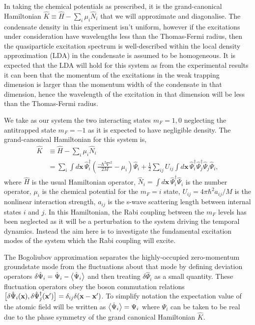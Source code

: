 In taking the chemical potentials as prescribed, it is the grand-canonical Hamiltonian $\hat{K} \equiv \hat{H} - \sum_i \mu_i \hat{N}_i$ that we will approximate and diagonalise.  The condensate density in this experiment isn't uniform, however if the excitations under consideration have wavelengths less than the Thomas-Fermi radius, then the quasiparticle excitation spectrum is well-described within the local density approximation (LDA) \citep{Stamper-Kurn:1999,Zambelli:2000} in the condensate is assumed to be homogeneous.  It is expected that the LDA will hold for this system as from the experimental results it can been that the momentum of the excitations in the weak trapping dimension is larger than the momentum width of the condensate in that dimension, hence the wavelength of the excitation in that dimension will be less than the Thomas-Fermi radius.


We take as our system the two interacting states $m_F=1, 0$ neglecting the antitrapped state $m_F=-1$ as it is expected to have negligible density. The grand-canonical Hamiltonian for this system is,
\begin{align}
    \hat{K} &\equiv \hat{H} - \sum_i \mu_i \hat{N}_i\\
            &= \sum_i \int d\mathbf{x}\, \hat{\Psi}_i^\dagger \left(\frac{-\hbar^2 \nabla^2}{2 M} - \mu_i\right)\hat{\Psi}_i + \frac{1}{2} \sum_{i j} U_{i j}\int d\mathbf{x}\, \hat{\Psi}_i^\dagger \hat{\Psi}_j^\dagger \hat{\Psi}_j \hat{\Psi}_i,
\end{align}
where $\hat{H}$ is the usual Hamiltonian operator, $\hat{N}_i= \int d\mathbf{x}\, \hat{\Psi}_i^\dagger \hat{\Psi}_i$ is the number operator, $\mu_i$ is the chemical potential for the $m_F=i$ state, $U_{ij} = 4\pi \hbar^2 a_{ij}/M$ is the nonlinear interaction strength, $a_{ij}$ is the s-wave scattering length between internal states $i$ and $j$. In this Hamiltonian, the Rabi coupling between the $m_F$ levels has been neglected as it will be a perturbation to the system driving the temporal dynamics. Instead the aim here is to investigate the fundamental excitation modes of the system which the Rabi coupling will excite.

The Bogoliubov approximation separates the highly-occupied zero-momentum groundstate mode from the fluctuations about that mode by defining deviation operators $\delta\hat{\Psi}_i = \hat{\Psi}_i - \big<\hat{\Psi}_i\big>$ and then treating $\delta\hat{\Psi}_i$ as a small quantity. These fluctuation operators obey the boson commutation relations $\big[\delta\hat{\Psi}_i(\mathbf{x}), \delta \hat{\Psi}_j^\dagger(\mathbf{x}')\big] = \delta_{i j} \delta(\mathbf{x}-\mathbf{x}')$. To simplify notation the expectation value of the atomic field will be written as $\big<\hat{\Psi}_i\big> = \Psi_i$ where $\Psi_i$ can be taken to be real due to the phase symmetry of the grand canonical Hamiltonian $\hat{K}$.

